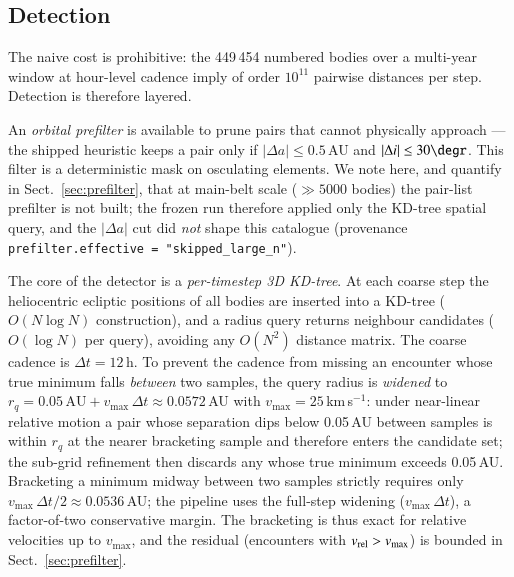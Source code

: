 \documentclass{aa}
\begin{document}
\subsection{Detection}
\label{sec:detection}

The naive cost is prohibitive: the 449\,454 numbered bodies over a multi-year
window at hour-level cadence imply of order $10^{11}$ pairwise distances per step.
Detection is therefore layered.

An \emph{orbital prefilter} is available to prune pairs that cannot physically
approach --- the shipped heuristic keeps a pair only if $|\Delta a|\leq0.5$\,AU
and $|\Delta i|\leq30\degr$. This filter is a deterministic mask on osculating
elements. We note here, and quantify in Sect.~\ref{sec:prefilter}, that at
main-belt scale ($\gg5000$ bodies) the pair-list prefilter is not built; the
frozen run therefore applied only the KD-tree spatial query, and the
$|\Delta a|$ cut did \emph{not} shape this catalogue (provenance
\texttt{prefilter.effective = "skipped\_large\_n"}).

The core of the detector is a \emph{per-timestep 3D KD-tree}. At each coarse
step the heliocentric ecliptic positions of all bodies are inserted into a
KD-tree ($O(N\log N)$ construction), and a radius query returns neighbour
candidates ($O(\log N)$ per query), avoiding any $O(N^2)$ distance matrix. The
coarse cadence is $\Delta t = 12$\,h. To prevent the cadence from missing an
encounter whose true minimum falls \emph{between} two samples, the query radius is
\emph{widened} to $r_q = 0.05\,\mathrm{AU} + v_{\max}\,\Delta t \approx
0.0572$\,AU with $v_{\max} = 25$\,km\,s$^{-1}$: under near-linear relative motion a
pair whose separation dips below 0.05\,AU between samples is within $r_q$ at the
nearer bracketing sample and therefore enters the candidate set; the sub-grid
refinement then discards any whose true minimum exceeds 0.05\,AU. Bracketing a
minimum midway between two samples strictly requires only $v_{\max}\,\Delta t/2
\approx 0.0536$\,AU; the pipeline uses the full-step widening ($v_{\max}\,\Delta
t$), a factor-of-two conservative margin. The bracketing is thus exact for
relative velocities up to $v_{\max}$, and the residual (encounters with
$v_{\rm rel} > v_{\max}$) is bounded in Sect.~\ref{sec:prefilter}.
\end{document}
